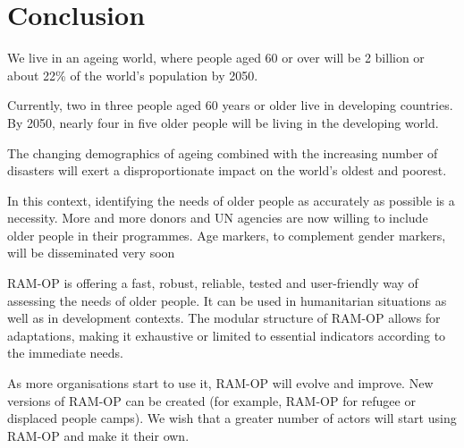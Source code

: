 \documentclass[12pt,]{book}
\theoremstyle{definition}
\theoremstyle{definition}
\theoremstyle{definition}
\theoremstyle{remark}
\begin{document}
\hypertarget{conclusion}{%
\chapter{Conclusion}\label{conclusion}}

We live in an ageing world, where people aged 60 or over will be 2
billion or about 22\% of the world's population by 2050.

Currently, two in three people aged 60 years or older live in developing
countries. By 2050, nearly four in five older people will be living in
the developing world.

The changing demographics of ageing combined with the increasing number
of disasters will exert a disproportionate impact on the world's oldest
and poorest.

In this context, identifying the needs of older people as accurately as
possible is a necessity. More and more donors and UN agencies are now
willing to include older people in their programmes. Age markers, to
complement gender markers, will be disseminated very soon

RAM-OP is offering a fast, robust, reliable, tested and user-friendly
way of assessing the needs of older people. It can be used in
humanitarian situations as well as in development contexts. The modular
structure of RAM-OP allows for adaptations, making it exhaustive or
limited to essential indicators according to the immediate needs.

As more organisations start to use it, RAM-OP will evolve and improve.
New versions of RAM-OP can be created (for example, RAM-OP for refugee
or displaced people camps). We wish that a greater number of actors will
start using RAM-OP and make it their own.


\end{document}
